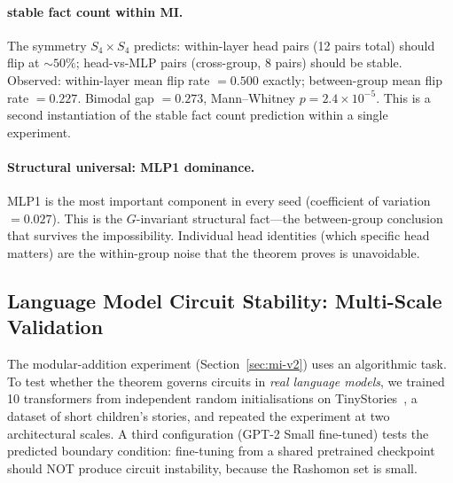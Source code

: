 \documentclass[11pt,a4paper]{article}
\begin{document}
\paragraph{stable fact count within MI.}
The symmetry $S_4 \times S_4$ predicts: within-layer head pairs (12 pairs total) should flip at $\sim 50\%$; head-vs-MLP pairs (cross-group, 8 pairs) should be stable.  Observed: within-layer mean flip rate $= 0.500$ exactly; between-group mean flip rate $= 0.227$.  Bimodal gap $= 0.273$, Mann--Whitney $p = 2.4 \times 10^{-5}$.  This is a second instantiation of the stable fact count prediction within a single experiment.

\paragraph{Structural universal: MLP1 dominance.}
MLP1 is the most important component in every seed (coefficient of variation $= 0.027$).  This is the $G$-invariant structural fact---the between-group conclusion that survives the impossibility.  Individual head identities (which specific head matters) are the within-group noise that the theorem proves is unavoidable.

\subsection{Language Model Circuit Stability: Multi-Scale Validation}
\label{sec:tinystories}

The modular-addition experiment (Section~\ref{sec:mi-v2}) uses an algorithmic task.  To test whether the theorem governs circuits in \emph{real language models}, we trained 10 transformers from independent random initialisations on TinyStories~\cite{eldan2023tinystories}, a dataset of short children's stories, and repeated the experiment at two architectural scales.  A third configuration (GPT-2 Small fine-tuned) tests the predicted boundary condition: fine-tuning from a shared pretrained checkpoint should NOT produce circuit instability, because the Rashomon set is small.
\end{document}
